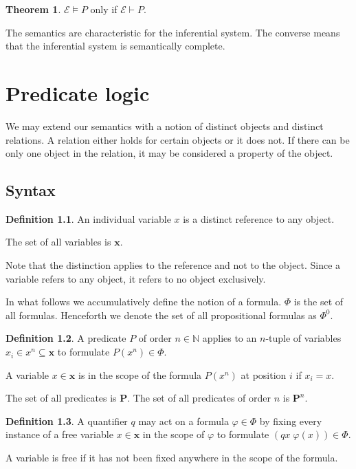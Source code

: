 \documentclass{amsbook}
\newcommand{\infers}{\mathrel\vdash}
\newcommand{\valids}{\mathrel\vDash}
\theoremstyle{definition}
\newtheorem{thm}{Theorem}[section]
\newtheorem{dfn}{Definition}[section]
\begin{document}
\begin{thm}
    $\mathcal E \valids P$ only if $\mathcal E \infers P$.

    The semantics are characteristic for the inferential system. The converse means that the inferential system is semantically complete.
\end{thm}

\chapter{Predicate logic}

We may extend our semantics with a notion of distinct objects and distinct relations. A relation either holds for certain objects or it does not. If there can be only one object in the relation, it may be considered a property of the object.

\section{Syntax}

\begin{dfn}
    An individual variable $x$ is a distinct reference to any object.

    The set of all variables is $\mathbf x$.
\end{dfn}

Note that the distinction applies to the reference and not to the object. Since a variable refers to any object, it refers to no object exclusively.

In what follows we accumulatively define the notion of a formula. $\Phi$ is the set of all formulas. Henceforth we denote the set of all propositional formulas as $\Phi^0$.

\begin{dfn}
    A predicate $P$ of order $n \in \mathbb N$ applies to an $n$-tuple of variables $x_i \in x^n \subseteq \mathbf x$ to formulate $P(x^n) \in \Phi$.

    A variable $x \in \mathbf x$ is in the scope of the formula $P(x^n)$ at position $i$ if $x_i = x$.

    The set of all predicates is $\mathbf P$.  The set of all predicates of order $n$ is $\mathbf P^n$.
\end{dfn}

\begin{dfn}
    A quantifier $q$ may act on a formula $\varphi \in \Phi$ by fixing every instance of a free variable $x \in \mathbf x$ in the scope of $\varphi$ to formulate $(qx\;\varphi(x)) \in \Phi$.

    A variable is free if it has not been fixed anywhere in the scope of the formula.
\end{dfn}
\end{document}
